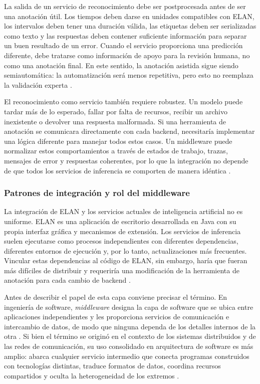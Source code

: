 \documentclass[11pt,a4paper]{article}
\begin{document}
La salida de un servicio de reconocimiento debe ser postprocesada antes de ser una anotación útil. Los tiempos deben darse en unidades compatibles con ELAN, los intervalos deben tener una duración válida, las etiquetas deben ser serializadas como texto y las respuestas deben contener suficiente información para separar un buen resultado de un error. Cuando el servicio proporciona una predicción diferente, debe tratarse como información de apoyo para la revisión humana, no como una anotación final. En este sentido, la anotación asistida sigue siendo semiautomática: la automatización será menos repetitiva, pero esto no reemplaza la validación experta \cite{auer2010elan}.

El reconocimiento como servicio también requiere robustez. Un modelo puede tardar más de lo esperado, fallar por falta de recursos, recibir un archivo inexistente o devolver una respuesta malformada. Si una herramienta de anotación se comunicara directamente con cada backend, necesitaría implementar una lógica diferente para manejar todos estos casos. Un middleware puede normalizar estos comportamientos a través de estados de trabajo, trazas, mensajes de error y respuestas coherentes, por lo que la integración no depende de que todos los servicios de inferencia se comporten de manera idéntica \cite{fastapi2026features,pydantic2026models}.

\subsubsection{Patrones de integración y rol del middleware}

La integración de ELAN y los servicios actuales de inteligencia artificial no es uniforme. ELAN es una aplicación de escritorio desarrollada en Java con su propia interfaz gráfica y mecanismos de extensión. Los servicios de inferencia suelen ejecutarse como procesos independientes con diferentes dependencias, diferentes entornos de ejecución y, por lo tanto, actualizaciones más frecuentes. Vincular estas dependencias al código de ELAN, sin embargo, haría que fueran más difíciles de distribuir y requeriría una modificación de la herramienta de anotación para cada cambio de backend \cite{dragoni2017microservices}.

Antes de describir el papel de esta capa conviene precisar el término. En ingeniería de software, \textit{middleware} designa la capa de software que se ubica entre aplicaciones independientes y les proporciona servicios de comunicación e intercambio de datos, de modo que ninguna dependa de los detalles internos de la otra \cite{bernstein1996middleware}. Si bien el término se originó en el contexto de los sistemas distribuidos y de las redes de comunicación, su uso consolidado en arquitectura de software es más amplio: abarca cualquier servicio intermedio que conecta programas construidos con tecnologías distintas, traduce formatos de datos, coordina recursos compartidos y oculta la heterogeneidad de los extremos \cite{bernstein1996middleware}.
\end{document}
